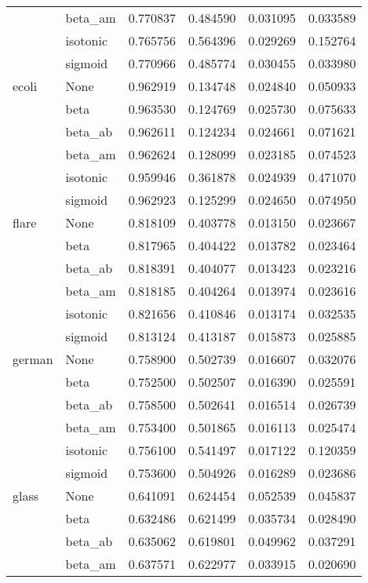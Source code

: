 \begin{tabular}{llrrrr}
        & beta\_am &  0.770837 &  0.484590 &  0.031095 &  0.033589 \\
        & isotonic &  0.765756 &  0.564396 &  0.029269 &  0.152764 \\
        & sigmoid &  0.770966 &  0.485774 &  0.030455 &  0.033980 \\
ecoli & None &  0.962919 &  0.134748 &  0.024840 &  0.050933 \\
        & beta &  0.963530 &  0.124769 &  0.025730 &  0.075633 \\
        & beta\_ab &  0.962611 &  0.124234 &  0.024661 &  0.071621 \\
        & beta\_am &  0.962624 &  0.128099 &  0.023185 &  0.074523 \\
        & isotonic &  0.959946 &  0.361878 &  0.024939 &  0.471070 \\
        & sigmoid &  0.962923 &  0.125299 &  0.024650 &  0.074950 \\
flare & None &  0.818109 &  0.403778 &  0.013150 &  0.023667 \\
        & beta &  0.817965 &  0.404422 &  0.013782 &  0.023464 \\
        & beta\_ab &  0.818391 &  0.404077 &  0.013423 &  0.023216 \\
        & beta\_am &  0.818185 &  0.404264 &  0.013974 &  0.023616 \\
        & isotonic &  0.821656 &  0.410846 &  0.013174 &  0.032535 \\
        & sigmoid &  0.813124 &  0.413187 &  0.015873 &  0.025885 \\
german & None &  0.758900 &  0.502739 &  0.016607 &  0.032076 \\
        & beta &  0.752500 &  0.502507 &  0.016390 &  0.025591 \\
        & beta\_ab &  0.758500 &  0.502641 &  0.016514 &  0.026739 \\
        & beta\_am &  0.753400 &  0.501865 &  0.016113 &  0.025474 \\
        & isotonic &  0.756100 &  0.541497 &  0.017122 &  0.120359 \\
        & sigmoid &  0.753600 &  0.504926 &  0.016289 &  0.023686 \\
glass & None &  0.641091 &  0.624454 &  0.052539 &  0.045837 \\
        & beta &  0.632486 &  0.621499 &  0.035734 &  0.028490 \\
        & beta\_ab &  0.635062 &  0.619801 &  0.049962 &  0.037291 \\
        & beta\_am &  0.637571 &  0.622977 &  0.033915 &  0.020690 \\

\end{tabular}

